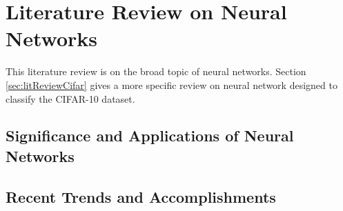 \section{Literature Review on Neural Networks}
     \pagestyle{mario}
     
This literature review is on the broad topic of neural networks. Section \ref{sec:litReviewCifar} gives a more specific review on neural network designed to classify the CIFAR-10 dataset.

\subsection{Significance and Applications of Neural Networks}

\subsection{Recent Trends and Accomplishments}